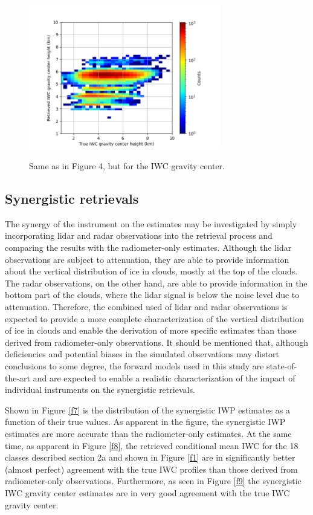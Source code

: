 \documentclass{ametsocV6.1}
\begin{document}
\begin{figure}[t]
    \centering
    \includegraphics[width=0.75\textwidth,angle=0]{./Figs/fig06.png}\\
    \caption{Same as in Figure 4, but for the IWC gravity center.}\label{f6}
\end{figure}

\subsection{Synergistic retrievals}

The synergy of the instrument on the estimates may be investigated by simply incorporating lidar 
and radar observations
into the retrieval process and comparing the results with the radiometer-only estimates.  Although
the lidar observations are subject to attenuation, they are able to provide information about the vertical
distribution of ice in clouds, mostly at the top of the clouds. The radar observations, on the other hand,
are able to provide information in the bottom part of the clouds, where the lidar signal is below the noise
level due to attenuation. Therefore, the combined used of lidar and radar observations is expected to 
provide a more complete characterization of the vertical distribution of ice in clouds and enable the
derivation of more specific estimates than those derived from radiometer-only observations. It should be mentioned that, 
although deficiencies 
and potential biases in the simulated observations may distort conclusions to some degree, the forward models
used in this study are state-of-the-art and are expected to enable a realistic characterization of the impact
of individual instruments on the synergistic retrievals.

Shown in Figure \ref{f7} is the distribution of the synergistic IWP estimates as a function of their true
values.  As apparent in the figure, the synergistic IWP estimates are more accurate than the radiometer-only
estimates. At the same time, as apparent in Figure \ref{f8}, the retrieved conditional mean IWC for the 
18 classes described section 2a and shown in Figure \ref{f1} are in significantly better (almost perfect)
agreement with the true IWC profiles than those derived from radiometer-only observations.  Furthermore,
as seen in Figure \ref{f9} the synergistic IWC gravity center estimates are in very good agreement with 
the true IWC gravity center.
\end{document}
